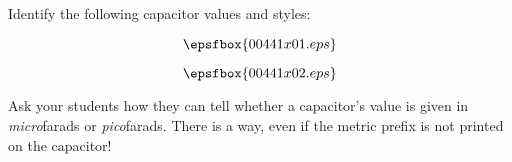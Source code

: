 

Identify the following capacitor values and styles:

$$\epsfbox{00441x01.eps}$$







$$\epsfbox{00441x02.eps}$$







Ask your students how they can tell whether a capacitor's value is given in {\it micro}farads or {\it pico}farads.  There is a way, even if the metric prefix is not printed on the capacitor!




